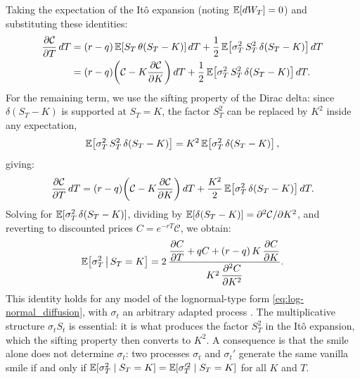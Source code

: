 Taking the expectation of the It\^{o} expansion (noting $\mathbb{E}[dW_T] = 0$) and substituting these identities:
\begin{equation*}
\begin{aligned}
    \frac{\partial \mathcal{C}}{\partial T}\,dT
        & = (r-q)\,\mathbb{E}[S_T\,\theta(S_T-K)]\,dT
        + \frac{1}{2}\,\mathbb{E}\!\left[\sigma_T^2\,S_T^2\,\delta(S_T - K)\right]dT \\
        & = (r-q)\!\left(\mathcal{C} - K\frac{\partial \mathcal{C}}{\partial K}\right)dT
        + \frac{1}{2}\,\mathbb{E}\!\left[\sigma_T^2\,S_T^2\,\delta(S_T - K)\right]dT.
\end{aligned}
\end{equation*}
For the remaining term, we use the sifting property of the Dirac delta:
since $\delta(S_T - K)$ is supported at $S_T = K$, the factor $S_T^2$ can be replaced by $K^2$ inside any expectation,
\begin{equation*}
    \mathbb{E}\!\left[\sigma_T^2\,S_T^2\,\delta(S_T - K)\right] = K^2\,\mathbb{E}\!\left[\sigma_T^2\,\delta(S_T - K)\right],
\end{equation*}
giving:
\begin{equation*}
    \frac{\partial \mathcal{C}}{\partial T}\,dT
    = (r-q)\!\left(\mathcal{C} - K\frac{\partial \mathcal{C}}{\partial K}\right)dT
    + \frac{K^2}{2}\,\mathbb{E}\!\left[\sigma_T^2\,\delta(S_T - K)\right]dT.
\end{equation*}
Solving for $\mathbb{E}[\sigma_T^2\,\delta(S_T - K)]$, dividing by
$\mathbb{E}[\delta(S_T - K)] = \partial^2\mathcal{C}/\partial K^2$,
and reverting to discounted prices $C = e^{-rT}\mathcal{C}$, we obtain:
\begin{equation}\label{eq:dupire_general}
    \mathbb{E}\!\left[\sigma_T^2 \,\middle|\, S_T = K\right]
    = 2\,\frac{\dfrac{\partial C}{\partial T} + qC + (r-q)\,K\,\dfrac{\partial C}{\partial K}}
           {K^2\,\dfrac{\partial^2 C}{\partial K^2}}.
\end{equation}
This identity holds for any model of the lognormal-type form \eqref{eq:log-normal_diffusion},
with $\sigma_t$ an arbitrary adapted process \cite{bergomi_stochastic_vol}.
The multiplicative structure $\sigma_t S_t$ is essential: it is what produces the factor $S_T^2$ in the It\^{o} expansion,
which the sifting property then converts to $K^2$.
A consequence is that the smile alone does not determine $\sigma_t$:
two processes $\sigma_t$ and $\sigma_t'$ generate the same vanilla smile if and only if
$\mathbb{E}[\sigma_T^2 \mid S_T = K] = \mathbb{E}[\sigma_T^{\prime 2} \mid S_T = K]$ for all $K$ and $T$.

